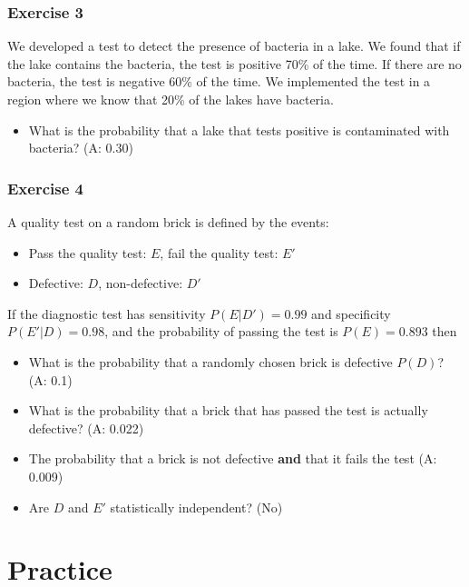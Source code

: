 \documentclass[
]{book}
\providecommand{\tightlist}{%
  \setlength{\itemsep}{0pt}\setlength{\parskip}{0pt}}
\begin{document}
\hypertarget{exercise-3-1}{%
\subsubsection{Exercise 3}\label{exercise-3-1}}

We developed a test to detect the presence of bacteria in a lake. We found that if the lake contains the bacteria, the test is positive 70\% of the time. If there are no bacteria, the test is negative 60\% of the time. We implemented the test in a region where we know that 20\% of the lakes have bacteria.

\begin{itemize}
\tightlist
\item
  What is the probability that a lake that tests positive is contaminated with bacteria? (A: 0.30)
\end{itemize}

\hypertarget{exercise-4-1}{%
\subsubsection{Exercise 4}\label{exercise-4-1}}

A quality test on a random brick is defined by the events:

\begin{itemize}
\tightlist
\item
  Pass the quality test: \(E\), fail the quality test: \(E'\)
\item
  Defective: \(D\), non-defective: \(D'\)
\end{itemize}

If the diagnostic test has sensitivity \(P(E|D')= 0.99\) and specificity \(P(E'|D)=0.98\), and the probability of passing the test is \(P(E) =0.893\) then

\begin{itemize}
\item
  What is the probability that a randomly chosen brick is defective \(P(D)\)? (A: 0.1)
\item
  What is the probability that a brick that has passed the test is actually defective? (A: 0.022)
\item
  The probability that a brick is not defective \textbf{and} that it fails the test (A: 0.009)
\item
  Are \(D\) and \(E'\) statistically independent? (No)
\end{itemize}

\hypertarget{practice-2}{%
\section{Practice}\label{practice-2}}
\end{document}
